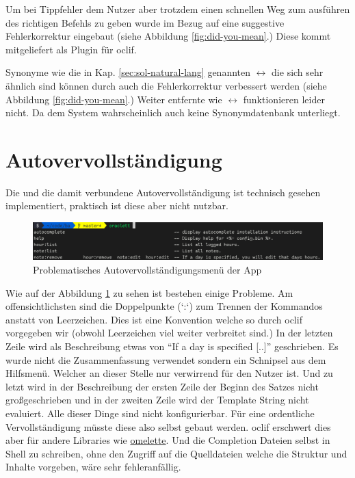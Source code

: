 \documentclass[oneside,bibliography=totocnumbered,BCOR=5mm]{scrbook}
\begin{document}
Um bei Tippfehler dem Nutzer aber trotzdem einen schnellen Weg zum ausführen des
richtigen Befehls zu geben wurde im Bezug auf  eine suggestive
Fehlerkorrektur eingebaut (siehe Abbildung \ref{fig:did-you-mean}.) Diese kommt
mitgeliefert als Plugin für oclif.

\medskip

Synonyme wie die in Kap. \ref{sec:sol-natural-lang} genannten 
$\leftrightarrow$  die sich sehr ähnlich sind können
durch auch die Fehlerkorrektur verbessert werden (siehe Abbildung
\ref{fig:did-you-mean}.) Weiter entfernte wie 
$\leftrightarrow$  funktionieren leider nicht. Da dem System
wahrscheinlich auch keine Synonymdatenbank unterliegt.

\section{Autovervollständigung}
\label{sec:impl-autocomplete}

Die  und die damit verbundene Autovervollständigung ist
technisch gesehen implementiert, praktisch ist diese aber nicht nutzbar.

\begin{figure}
  \centering
  \includegraphics[scale=0.5]{apps-autocomplete.png}
  \caption{Problematisches Autovervollständigungsmenü der App}
  \label{fig:apps-autocomplete}
\end{figure}

Wie auf der Abbildung \ref{fig:apps-autocomplete} zu sehen ist bestehen einige
Probleme. Am offensichtlichsten sind die Doppelpunkte (`:`) zum Trennen
der Kommandos anstatt von Leerzeichen. Dies ist eine Konvention welche
so durch oclif vorgegeben wir (obwohl Leerzeichen viel weiter verbreitet
sind.) In der letzten Zeile wird als Beschreibung etwas von ``If a day is
specified [..]'' geschrieben. Es wurde nicht die Zusammenfassung verwendet
sondern ein Schnipsel aus dem Hilfsmenü. Welcher an dieser Stelle nur
verwirrend für den Nutzer ist. Und zu letzt wird in der Beschreibung der
ersten Zeile der Beginn des Satzes nicht großgeschrieben und in der zweiten
Zeile wird der Template String nicht evaluiert. Alle dieser Dinge sind nicht
konfigurierbar. Für eine ordentliche Vervollständigung müsste diese also
selbst gebaut werden. oclif erschwert dies aber für andere Libraries wie
\href{https://github.com/f/omelette/issues/52}{omelette}. Und die Completion
Dateien selbst in Shell zu schreiben, ohne den Zugriff auf die Quelldateien
welche die Struktur und Inhalte vorgeben, wäre sehr fehleranfällig.
\end{document}
